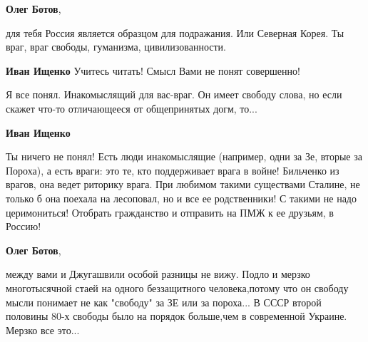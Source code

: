 \begin{itemize}
\begin{itemize}
 
\textbf{Олег Ботов}, 

для тебя Россия является образцом для подражания. Или Северная Корея. Ты
враг, враг свободы, гуманизма, цивилизованности.

 
\textbf{Иван Ищенко} Учитесь читать! Смысл Вами не понят совершенно!

 
Я все понял. Инакомыслящий для вас-враг. Он имеет свободу слова, но если скажет что-то отличающееся от общепринятых догм, то...

 
\textbf{Иван Ищенко} 

Ты ничего не понял! Есть люди инакомыслящие (например, одни за Зе, вторые за
Пороха), а есть враги: это те, кто поддерживает врага в войне! Бильченко из
врагов, она ведет риторику врага. При любимом такими существами Сталине, не
только б она поехала на лесоповал, но и все ее родственники! С такими не надо
церимониться! Отобрать гражданство и отправить на ПМЖ к ее друзьям, в Россию!

 
\textbf{Олег Ботов},

между вами и Джугашвили особой разницы не вижу. Подло и мерзко многотысячной
стаей на одного беззащитного человека,потому что он свободу мысли понимает не
как "свободу" за ЗЕ или за пороха... В СССР второй половины 80-х свободы было
на порядок больше,чем в современной Украине. Мерзко все это...




\end{itemize}
\end{itemize}
